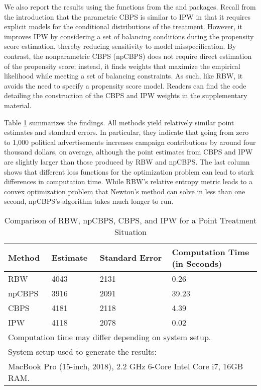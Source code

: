 We also report the results using the functions from the 
and  packages. Recall from the introduction that the
parametric CBPS is similar to IPW in that it requires explicit models
for the conditional distributions of the treatment. However, it improves
IPW by considering a set of balancing conditions during the propensity
score estimation, thereby reducing sensitivity to model
misspecification. By contrast, the nonparametric CBPS (npCBPS) does not
require direct estimation of the propensity score; instead, it finds
weights that maximize the empirical likelihood while meeting a set of
balancing constraints. As such, like RBW, it avoids the need to specify
a propensity score model. Readers can find the code detailing the
construction of the CBPS and IPW weights in the supplementary material.

Table \ref{tab:point-treatment-comparison} summarizes the findings. All
methods yield relatively similar point estimates and standard errors. In
particular, they indicate that going from zero to 1,000 political
advertisements increases campaign contributions by around four thousand
dollars, on average, although the point estimates from CBPS and IPW are
slightly larger than those produced by RBW and npCBPS. The last column
shows that different loss functions for the optimization problem can
lead to stark differences in computation time. While RBW's relative
entropy metric leads to a convex optimization problem that Newton's
method can solve in less than one second, npCBPS's algorithm takes much
longer to run.

\begin{Schunk}
\begin{table}[ht]

\caption{\label{tab:point-treatment-comparison}Comparison of RBW, npCBPS, CBPS, and IPW for a Point Treatment Situation}
\centering
\begin{tabular}[t]{llll}
\toprule
Method & Estimate & Standard Error & \makecell[l]{Computation Time\\(in Seconds)}\\
\midrule
RBW & 4043 & 2131 & 0.26\\
npCBPS & 3916 & 2091 & 39.23\\
CBPS & 4181 & 2118 & 4.39\\
IPW & 4118 & 2078 & 0.02\\
\bottomrule
\multicolumn{4}{l}{\textsuperscript{} Computation time may differ depending on system setup.}\\
\multicolumn{4}{l}{\textsuperscript{} System setup used to generate the results:}\\
\multicolumn{4}{l}{\textsuperscript{} MacBook Pro (15-inch, 2018), 2.2 GHz 6-Core Intel Core i7, 16GB RAM.}\\
\end{tabular}
\end{table}

\end{Schunk}

